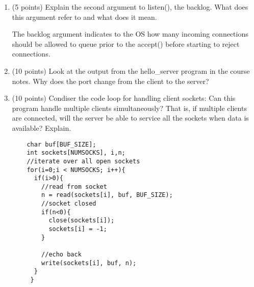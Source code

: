 \documentclass{article}[9pt]
\newenvironment{answerfont}{\fontfamily{qhv}\selectfont}{\par}
\newenvironment{myanswer}{\begin{mdframed}\begin{answerfont}}{\end{answerfont}\end{mdframed}}
\begin{document}
\begin{enumerate}
\item (5 points) Explain the second argument to listen(), the backlog. What does this argument refer to and what does it mean.

  \begin{myanswer}
  The backlog argument indicates to the OS how many incoming connections should be allowed to queue prior to the accept() before starting to reject connections.
  \end{myanswer}


\item (10 points) Look at the output from the hello_server program in the course notes. Why does the port change from the client to the server?

    \begin{myanswer}
    
    \end{myanswer}


\item (10 points) Condiser the code loop for handling client sockets: Can this program handle multiple clients simultaneously? That is, if multiple clients are connected, will the server be able to service all the sockets when data is available? Explain.
  \begin{enumerate}
  \begin{verbatim}
    char buf[BUF_SIZE];
    int sockets[NUMSOCKS], i,n;
    //iterate over all open sockets
    for(i=0;i < NUMSOCKS; i++){
      if(i>0){
        //read from socket
        n = read(sockets[i], buf, BUF_SIZE);
        //socket closed
        if(n<0){
          close(sockets[i]);
          sockets[i] = -1;
        }

        //echo back
        write(sockets[i], buf, n);
      }
     }
  \end{verbatim}
  \end{enumerate}

  \begin{myanswer}
  \end{myanswer}

\end{enumerate}
\end{document}
